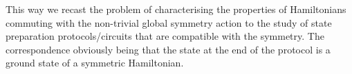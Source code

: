 \documentclass[a4paper,twocolumn,11pt]{quantumarticle}
\begin{document}
This way we recast the problem of characterising the properties of Hamiltonians commuting with the non-trivial global symmetry action to the study of state preparation protocols/circuits that are compatible with the symmetry. The correspondence obviously being that the state at the end of the protocol is a ground state of a symmetric Hamiltonian.

 




\end{document}
